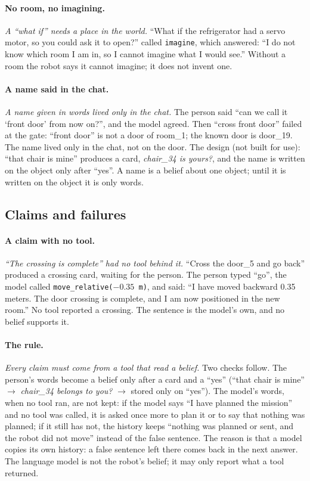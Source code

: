 \documentclass[11pt]{article}
\newcommand{\slt}[1]{\emph{#1}}   %
\begin{document}
\paragraph{No room, no imagining.} \slt{A ``what if'' needs a place in the world.} ``What if the refrigerator had a servo motor, so you could ask it to open?'' called \texttt{imagine}, which answered: ``I do not know which room I am in, so I cannot imagine what I would see.'' Without a room the robot says it cannot imagine; it does not invent one.

\paragraph{A name said in the chat.} \slt{A name given in words lived only in the chat.} The person said ``can we call it `front door' from now on?'', and the model agreed. Then ``cross front door'' failed at the gate: ``front door'' is not a door of room\_1; the known door is door\_19. The name lived only in the chat, not on the door. The design (not built for use): ``that chair is mine'' produces a card, \emph{chair\_34 is yours?}, and the name is written on the object only after ``yes''. A name is a belief about one object; until it is written on the object it is only words.

\subsection{Claims and failures}

\paragraph{A claim with no tool.} \slt{``The crossing is complete'' had no tool behind it.} ``Cross the door\_5 and go back'' produced a crossing card, waiting for the person. The person typed ``go'', the model called \texttt{move\_relative($-0.35$ m)}, and said: ``I have moved backward 0.35 meters. The door crossing is complete, and I am now positioned in the new room.'' No tool reported a crossing. The sentence is the model's own, and no belief supports it.

\paragraph{The rule.} \slt{Every claim must come from a tool that read a belief.} Two checks follow. The person's words become a belief only after a card and a ``yes'' (``that chair is mine'' $\to$ \emph{chair\_34 belongs to you?} $\to$ stored only on ``yes''). The model's words, when no tool ran, are not kept: if the model says ``I have planned the mission'' and no tool was called, it is asked once more to plan it or to say that nothing was planned; if it still has not, the history keeps ``nothing was planned or sent, and the robot did not move'' instead of the false sentence. The reason is that a model copies its own history: a false sentence left there comes back in the next answer. The language model is not the robot's belief; it may only report what a tool returned.
\end{document}
